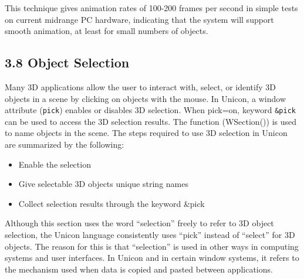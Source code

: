 \documentclass[letterpaper]{article}
\begin{document}
{\bigskip


\bigskip

\noindent
This technique gives animation rates of 100-200 frames per second in
simple tests on current midrange PC hardware, indicating that the
system will support smooth animation, at least for small numbers of
objects.


\subsection[3.8 Object Selection]{3.8 Object Selection}

Many 3D applications allow the user to interact with, select, or
identify 3D objects in a scene by clicking on objects with the
mouse. In Unicon, a window attribute (\texttt{pick}) enables or
disables 3D selection. When pick=on, keyword \texttt{\&pick} can be
used to access the 3D selection results. The function (WSection()) is
used to name objects in the scene. The steps required to use 3D
selection in Unicon are summarized by the following:

\bigskip

\begin{itemize}
\item Enable the selection
\item Give selectable 3D objects unique string names
\item Collect selection results through the keyword \textsf{\&pick}
\end{itemize}

\bigskip

Although this section uses the word ``selection'' freely to refer to
3D object selection, the Unicon language consistently uses ``pick''
instead of ``select'' for 3D objects. The reason for this is that
``selection'' is used in other ways in computing systems and user
interfaces. In Unicon and in certain window systems, it refers to the
mechanism used when data is copied and pasted between applications.


}
\end{document}
